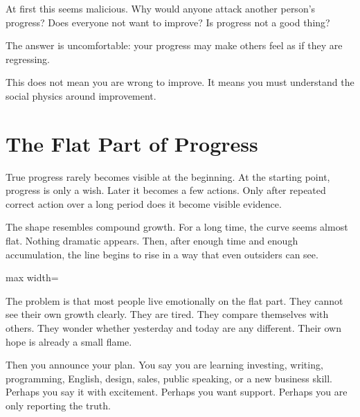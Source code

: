 At first this seems malicious. Why would anyone attack another person's progress? Does everyone not want to improve? Is progress not a good thing?

The answer is uncomfortable: your progress may make others feel as if they are regressing.

This does not mean you are wrong to improve. It means you must understand the social physics around improvement.

\section*{The Flat Part of Progress}

True progress rarely becomes visible at the beginning. At the starting point, progress is only a wish. Later it becomes a few actions. Only after repeated correct action over a long period does it become visible evidence.

The shape resembles compound growth. For a long time, the curve seems almost flat. Nothing dramatic appears. Then, after enough time and enough accumulation, the line begins to rise in a way that even outsiders can see.

\begin{center}
\begin{adjustbox}{max width=\linewidth}
\end{adjustbox}
\end{center}

The problem is that most people live emotionally on the flat part. They cannot see their own growth clearly. They are tired. They compare themselves with others. They wonder whether yesterday and today are any different. Their own hope is already a small flame.

Then you announce your plan. You say you are learning investing, writing, programming, English, design, sales, public speaking, or a new business skill. Perhaps you say it with excitement. Perhaps you want support. Perhaps you are only reporting the truth.


